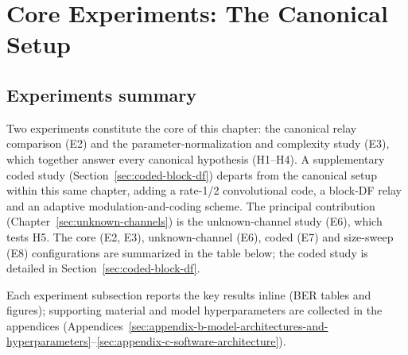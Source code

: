 \chapter{Core Experiments: The Canonical Setup}\label{sec:experiments}

\section{Experiments summary}\label{sec:experiments-summary}

Two experiments constitute the core of this chapter: the canonical relay comparison (E2) and the parameter-normalization and complexity study (E3), which together answer every canonical hypothesis (H1--H4). A supplementary coded study (Section~\ref{sec:coded-block-df}) departs from the canonical setup within this same chapter, adding a rate-1/2 convolutional code, a block-DF relay and an adaptive modulation-and-coding scheme. The principal contribution (Chapter~\ref{sec:unknown-channels}) is the unknown-channel study (E6), which tests H5.
The core (E2, E3), unknown-channel (E6), coded (E7) and size-sweep (E8) configurations are summarized in the table below; the coded study is detailed in Section~\ref{sec:coded-block-df}.

Each experiment subsection reports the key results inline (BER tables and figures); supporting material and model hyperparameters are collected in the appendices (Appendices~\ref{sec:appendix-b-model-architectures-and-hyperparameters}--\ref{sec:appendix-c-software-architecture}).

